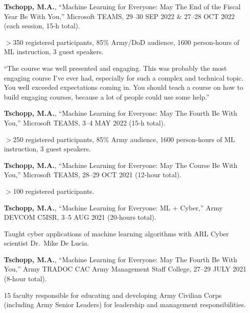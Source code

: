 \begin{cvlist}
\item
\textbf{Tschopp, M.A.}, ``Machine Learning for Everyone: May The End of the Fiscal Year Be With You,'' Microsoft TEAMS, 29--30 SEP 2022 \& 27--28 OCT 2022 (each session, 15-h total).
\begin{list2}
\item[$\star$] $>$350 registered participants, 85\% Army/DoD audience, 1600 person-hours of ML instruction, 3 guest speakers.
\item[$\star$] ``The course was well presented and engaging.  This was probably the most engaging course I've ever had, especially for such a complex and technical topic.  You well exceeded expectations coming in.  You should teach a course on how to build engaging courses, because a lot of people could use some help.''
\end{list2}

\item
\textbf{Tschopp, M.A.}, ``Machine Learning for Everyone: May The Fourth Be With You,'' Microsoft TEAMS, 3--4 MAY 2022 (15-h total).
\begin{list2}
\item[$\star$] $>$250 registered participants, 85\% Army audience, 1600 person-hours of ML instruction, 3 guest speakers.
\end{list2}

\item
\textbf{Tschopp, M.A.}, ``Machine Learning for Everyone: May The Course Be With You,'' Microsoft TEAMS, 28--29 OCT 2021 (12-hour total).
\begin{list2}
\item[$\star$] $>$100 registered participants.
\end{list2}

\item
\textbf{Tschopp, M.A.}, ``Machine Learning for Everyone: ML + Cyber,'' Army DEVCOM C5ISR, 3--5 AUG 2021 (20-hours total).
\begin{list2}
\item[$\star$] Taught cyber applications of machine learning algorithms with ARL Cyber scientist Dr.~Mike De Lucia.
\end{list2}

\item
\textbf{Tschopp, M.A.}, ``Machine Learning for Everyone: May The Fourth Be With You,'' Army TRADOC CAC Army Management Staff College, 27--29 JULY 2021 (8-hour total).
\begin{list2}
\item[$\star$] 15 faculty responsible for educating and developing Army Civilian Corps (including Army Senior Leaders) for leadership and management responsibilities.
\end{list2}


\end{cvlist}
